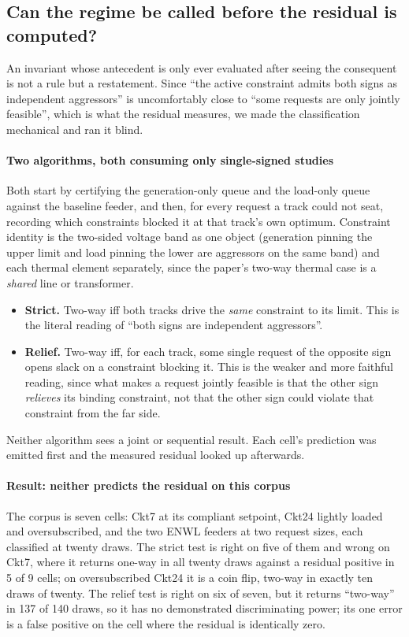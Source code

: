 \documentclass[review,authoryear,12pt]{elsarticle}
\begin{document}
\subsection{Can the regime be called before the residual is computed?}
\label{sec:blind}

An invariant whose antecedent is only ever evaluated after seeing the
consequent is not a rule but a restatement. Since ``the active constraint
admits both signs as independent aggressors'' is uncomfortably close to ``some
requests are only jointly feasible'', which is what the residual measures, we
made the classification mechanical and ran it blind.

\paragraph{Two algorithms, both consuming only single-signed studies}
Both start by certifying the generation-only queue and the load-only queue
against the baseline feeder, and then, for every request a track could not
seat, recording which constraints blocked it at that track's own optimum.
Constraint identity is the two-sided voltage band as one object (generation
pinning the upper limit and load pinning the lower are aggressors on the same
band) and each thermal element separately, since the paper's two-way thermal
case is a \emph{shared} line or transformer.
\begin{itemize}
  \item \textbf{Strict.} Two-way iff both tracks drive the \emph{same}
    constraint to its limit. This is the literal reading of ``both signs are
    independent aggressors''.
  \item \textbf{Relief.} Two-way iff, for each track, some single request of
    the opposite sign opens slack on a constraint blocking it. This is the
    weaker and more faithful reading, since what makes a request
    jointly feasible is that the other sign \emph{relieves} its binding
    constraint, not that the other sign could violate that constraint from the
    far side.
\end{itemize}
Neither algorithm sees a joint or sequential result. Each cell's prediction was
emitted first and the measured residual looked up afterwards.

\paragraph{Result: neither predicts the residual on this corpus}
The corpus is seven cells: Ckt7 at its compliant setpoint, Ckt24 lightly
loaded and oversubscribed, and the two ENWL feeders at two request sizes, each
classified at twenty draws. The strict test is right on five of them and
wrong on Ckt7, where it returns one-way in all twenty draws against a residual
positive in 5 of 9 cells; on oversubscribed Ckt24 it is a coin flip, two-way in
exactly ten draws of twenty. The relief test is right on six of seven, but it
returns ``two-way'' in 137 of 140 draws, so it has no demonstrated
discriminating power; its one error is a false positive on the cell where the
residual is identically zero.
\end{document}
